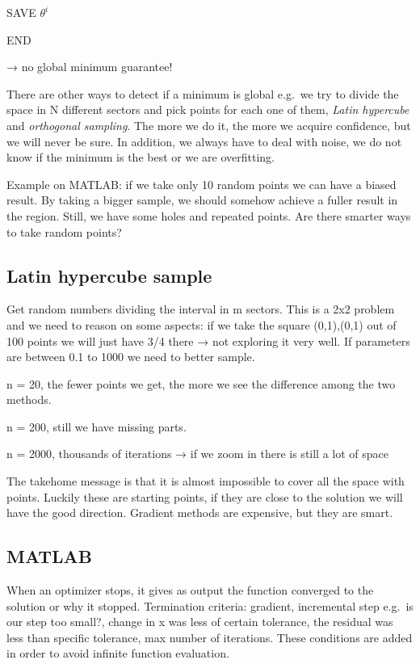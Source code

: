 SAVE $\theta^i$

END

→ no global minimum guarantee!

There are other ways to detect if a minimum is global e.g.~we try to
divide the space in N different sectors and pick points for each one of
them, \emph{Latin hypercube} and \emph{orthogonal sampling}. The more we
do it, the more we acquire confidence, but we will never be sure. In
addition, we always have to deal with noise, we do not know if the
minimum is the best or we are overfitting.

Example on MATLAB: if we take only 10 random points we can have a biased
result. By taking a bigger sample, we should somehow achieve a fuller
result in the region. Still, we have some holes and repeated points. Are
there smarter ways to take random points?

\hypertarget{latin-hypercube-sample}{%
\subsection{Latin hypercube sample}\label{latin-hypercube-sample}}

Get random numbers dividing the interval in m sectors. This is a 2x2
problem and we need to reason on some aspects: if we take the square
(0,1),(0,1) out of 100 points we will just have 3/4 there → not
exploring it very well. If parameters are between 0.1 to 1000 we need to
better sample.

n = 20, the fewer points we get, the more we see the difference among
the two methods.

n = 200, still we have missing parts.

n = 2000, thousands of iterations → if we zoom in there is still a lot
of space

The takehome message is that it is almost impossible to cover all the
space with points. Luckily these are starting points, if they are close
to the solution we will have the good direction. Gradient methods are
expensive, but they are smart.

\hypertarget{matlab}{%
\subsection{MATLAB}\label{matlab}}

When an optimizer stops, it gives as output the function converged to
the solution or why it stopped. Termination criteria: gradient,
incremental step e.g.~is our step too small?, change in x was less of
certain tolerance, the residual was less than specific tolerance, max
number of iterations. These conditions are added in order to avoid
infinite function evaluation.

